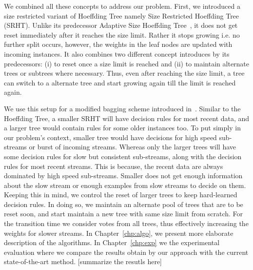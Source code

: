 We combined all these concepts to address our problem. First, we introduced a size restricted variant of Hoeffding Tree namely Size Restricted Hoeffding Tree (SRHT). Unlike its predecessor Adaptive Size Hoeffding Tree~\cite{bifet09:asht}, it does not get reset immediately after it reaches the size limit. Rather it stops growing i.e. no further split occurs, however, the weights in the leaf nodes are updated with incoming instances. It also combines two different concept introduces by its predecessors: (i) to reset once a size limit is reached and (ii) to maintain alternate trees or subtrees where necessary. Thus, even after reaching the size limit, a tree can switch to a alternate tree and start growing again till the limit is reached again. 

We use this setup for a modified bagging scheme introduced in~\cite{bifet09:asht}. Similar to the Hoeffding Tree, a smaller SRHT will have decision rules for most recent data, and a larger tree would contain rules for some older instances too. To put simply in our problem's context, smaller tree would have decisions for high speed sub-streams or burst of incoming streams. Whereas only the larger trees will have some decision rules for slow but consistent sub-streams, along with the decision rules for most recent streams. This is because, the recent data are always dominated by high speed sub-streams. Smaller does not get enough information about the slow stream or enough examples from slow streams to decide on them. Keeping this in mind, we control the reset of larger trees to keep hard-learned decision rules. In doing so, we maintain an alternate pool of trees that are to be reset soon, and start maintain a new tree with same size limit from scratch. For the transition time we consider votes from all trees, thus effectively increasing the weights for slower streams. In Chapter~\ref{chp:algo}, we present more elaborate description of the algorithms. In Chapter~\ref{chp:exp} we the  experimental evaluation where we compare the results obtain by our approach with the current state-of-the-art method. [summarize the resutls here]



